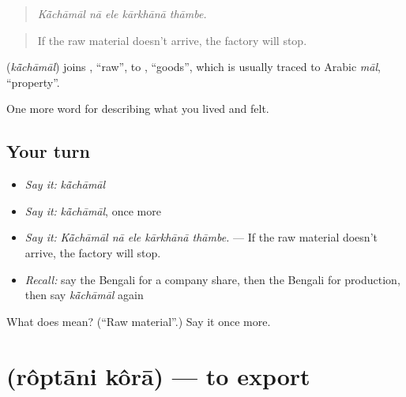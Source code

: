 \begin{quote}
    
\end{quote}

\begin{quote}
\emph{Kā̃chāmāl nā ele kārkhānā thāmbe.}
\end{quote}

\begin{quote}
If the raw material doesn't arrive, the factory will stop.
\end{quote}

\begin{cousinweb}
\textbf{} (\emph{kā̃chāmāl}) joins , \textquotedblleft{}raw\textquotedblright{}, to , \textquotedblleft{}goods\textquotedblright{}, which is usually traced to Arabic \emph{māl}, \textquotedblleft{}property\textquotedblright{}.
\end{cousinweb}

\begin{grammarlens}[title={What you've built}]
One more word for describing what you lived and felt.
\end{grammarlens}

\subsection*{Your turn}
\begin{itemize}
\raggedright
  \item \emph{Say it:} \emph{kā̃chāmāl}
  \item \emph{Say it:} \emph{kā̃chāmāl}, once more
  \item \emph{Say it:} \emph{Kā̃chāmāl nā ele kārkhānā thāmbe.} — If the raw material doesn't arrive, the factory will stop.
  \item \emph{Recall:} say the Bengali for a company share, then the Bengali for production, then say \emph{kā̃chāmāl} again
\end{itemize}

\begin{tcolorbox}[breakable,colback=teal!4,colframe=teal!35!black,title={Before you move on}]
What does  mean? (\textquotedblleft{}Raw material\textquotedblright{}.) Say it once more.
\end{tcolorbox}
\section[\texorpdfstring{\bn{রপ্তানি} \bn{করা} (rôptāni kôrā)}{রপ্তানি করা (rôptāni kôrā)}]{  (rôptāni kôrā) — to export}

